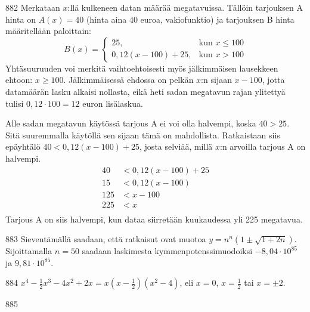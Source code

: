 \begin{Vastaus}{882}
	Merkataan $x$:llä kulkeneen datan määrää megatavuissa. Tällöin tarjouksen A hinta on $A(x)=40$ (hinta aina $40$ euroa, vakiofunktio) ja tarjouksen B hinta määritellään paloittain:
	$$B(x)=\begin{cases}
	25, & \mbox{kun } x\leq 100 \\
	0,12(x-100)+25, & \mbox{kun } x>100
	\end{cases}$$
Yhtäsuuruuden voi merkitä vaihtoehtoisesti myös jälkimmäisen lausekkeen ehtoon: $x\geq 100$. Jälkimmäisessä ehdossa on pelkän $x$:n sijaan $x-100$, jotta datamäärän lasku alkaisi nollasta, eikä heti sadan megatavun rajan ylitettyä tulisi $0,12\cdot 100=12$ euron lisälaskua.

Alle sadan megatavun käytössä tarjous A ei voi olla halvempi, koska $40>25$. Sitä suuremmalla käytöllä sen sijaan tämä on mahdollista. Ratkaistaan siis epäyhtälö $40<0,12(x-100)+25$, josta selviää, millä $x$:n arvoilla tarjous A on halvempi.
\begin{align*}
40&<0,12(x-100)+25 \\
15 &<0,12(x-100) \\
125&<x-100 \\
225&<x \\
\end{align*}
	Tarjous A on siis halvempi, kun dataa siirretään kuukaudessa yli 225 megatavua.
	
\end{Vastaus}
\begin{Vastaus}{883}
	Sieventämällä saadaan, että ratkaisut ovat muotoa $y=n^n (1\pm \sqrt{1+2n})$. Sijoittamalla $n=50$ saadaan laskimesta kymmenpotenssimuodoiksi $-8,04\cdot 10^{85}$ ja $9,81\cdot 10^{85}$.
	
\end{Vastaus}
\begin{Vastaus}{884}
$x^4-\frac{1}{2}x^3-4x^2+2x=x(x-\frac{1}{2})(x^2-4)$, eli $x=0$, $x=\frac{1}{2}$ tai $x=\pm 2$.
	
\end{Vastaus}
\begin{Vastaus}{885}
		
\end{Vastaus}
